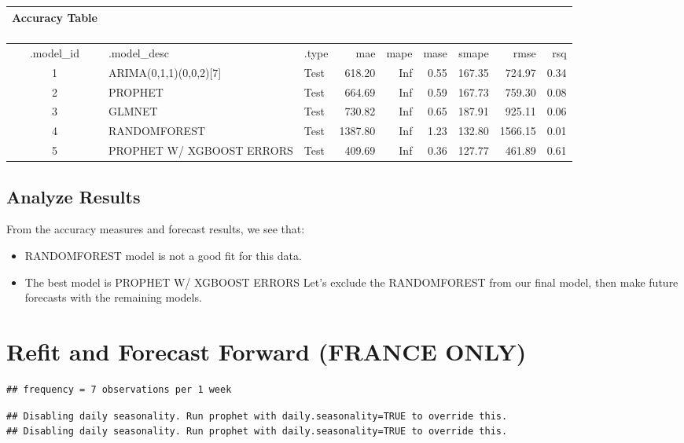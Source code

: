 \documentclass[
]{article}
\providecommand{\tightlist}{%
  \setlength{\itemsep}{0pt}\setlength{\parskip}{0pt}}
\begin{document}
\captionsetup[table]{labelformat=empty,skip=1pt}
\begin{longtable}{cllrrrrrr}
\caption*{
\large Accuracy Table\\ 
\small \\ 
} \\ 
\toprule
.model\_id & .model\_desc & .type & mae & mape & mase & smape & rmse & rsq \\ 
\midrule
1 & ARIMA(0,1,1)(0,0,2)[7] & Test & 618.20 & Inf & 0.55 & 167.35 & 724.97 & 0.34 \\ 
2 & PROPHET & Test & 664.69 & Inf & 0.59 & 167.73 & 759.30 & 0.08 \\ 
3 & GLMNET & Test & 730.82 & Inf & 0.65 & 187.91 & 925.11 & 0.06 \\ 
4 & RANDOMFOREST & Test & 1387.80 & Inf & 1.23 & 132.80 & 1566.15 & 0.01 \\ 
5 & PROPHET W/ XGBOOST ERRORS & Test & 409.69 & Inf & 0.36 & 127.77 & 461.89 & 0.61 \\ 
\bottomrule
\end{longtable}

\hypertarget{analyze-results-1}{%
\subsection{Analyze Results}\label{analyze-results-1}}

From the accuracy measures and forecast results, we see that:

\begin{itemize}
\tightlist
\item
  RANDOMFOREST model is not a good fit for this data.
\item
  The best model is PROPHET W/ XGBOOST ERRORS Let's exclude the
  RANDOMFOREST from our final model, then make future forecasts with the
  remaining models.
\end{itemize}

\hypertarget{refit-and-forecast-forward-france-only}{%
\section{Refit and Forecast Forward (FRANCE
ONLY)}\label{refit-and-forecast-forward-france-only}}

\begin{verbatim}
## frequency = 7 observations per 1 week
\end{verbatim}

\begin{verbatim}
## Disabling daily seasonality. Run prophet with daily.seasonality=TRUE to override this.
## Disabling daily seasonality. Run prophet with daily.seasonality=TRUE to override this.
\end{verbatim}
\end{document}
